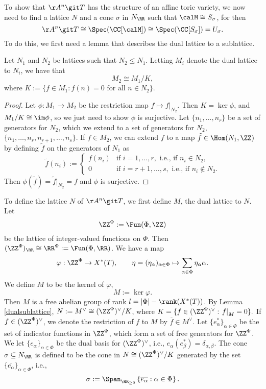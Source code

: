 To show that $\AA^n \git T$ has the structure of an affine toric variety, we now need to find a lattice $N$ and a cone $\sigma$ in $N_\RR$ such that $\calM \cong S_\sigma$, for then 
$$\AA^n \git T \cong \Spec(\CC[\calM]) \cong \Spec(\CC[S_\sigma]) = U_\sigma.$$
To do this, we first need a lemma that describes the dual lattice to a sublattice.

\begin{lemma}\label{dualsublattice}
Let $N_1$ and $N_2$ be lattices such that $N_2 \le N_1$.
Letting $M_i$ denote the dual lattice to $N_i$, we have that
$$M_2 \cong M_1 / K,$$
where $K := \{f \in M_1 : f(n) = 0 \text{ for all } n \in N_2\}.$
\end{lemma}
\begin{proof}
Let $\phi : M_1 \to M_2$ be the restriction map $f \mapsto \left. f \right|_{N_2}$.
Then $K = \ker \phi$, and $M_1 / K \cong \im \phi$, so we just need to show $\phi$ is surjective.
Let $\{n_1, \ldots, n_r\}$ be a set of generators for $N_2$, which we extend to a set of generators for $N_2$, $\{n_1, \ldots, n_r, n_{r+1}, \ldots, n_s\}$.
If $f \in M_2$, we can extend $f$ to a map $\tilde f \in \Hom(N_1, \ZZ)$ by defining $\tilde f$ on the generators of $N_1$ as
$$\tilde f(n_i) := \begin{cases} f(n_i) & \text{if } i = 1, \ldots, r, \text{ i.e., if } n_i \in N_2, \\ 0 & \text{if } i = r+1, \ldots, s, \text{ i.e., if } n_i \notin N_2. \end{cases}$$
Then $\phi(\tilde f) = \tilde f \big|_{N_2} = f$ and $\phi$ is surjective.
\end{proof}

To define the lattice $N$ of $\AA^n \git T$, we first define $M$, the dual lattice to $N$.
Let 
$$\ZZ^\Phi := \Fun(\Phi, \ZZ)$$ 
be the lattice of integer-valued functions on $\Phi$.
Then $(\ZZ^\Phi)_\RR \cong \RR^\Phi := \Fun(\Phi, \RR)$.
We have a map
$$\varphi : \ZZ^\Phi \to X^*(T), \qquad \eta = (\eta_\alpha)_{\alpha\in\Phi} \mapsto \sum_{\alpha \in \Phi} \eta_\alpha \alpha.$$
We define $M$ to be the kernel of $\varphi$,
$$M := \ker \varphi.$$
Then $M$ is a free abelian group of rank $l = |\Phi| - \rank(X^*(T))$.
By Lemma \ref{dualsublattice}, $N := M^\vee \cong (\ZZ^\Phi)^\vee / K$, where $K = \{f \in (\ZZ^\Phi)^\vee : \left. f \right|_{M} = 0\}.$
If $f \in (\ZZ^\Phi)^\vee$, we denote the restriction of $f$ to $M$ by $\overline{f} \in M^\vee$.
Let $\{e_\alpha^*\}_{\alpha\in\Phi}$ be the set of indicator functions in $\ZZ^\Phi$, which form a set of free generators for $\ZZ^\Phi$.
We let $\{e_\alpha\}_{\alpha\in\Phi}$ be the dual basis for $(\ZZ^\Phi)^\vee$, i.e., $e_\alpha(e^*_\beta) = \delta_{\alpha,\beta}$.
The cone $\sigma \subseteq N_\RR$ is defined to be the cone in $N \cong (\ZZ^\Phi)^\vee / K$ generated by the set $\{\overline{e_\alpha}\}_{\alpha\in\Phi}$, i.e.,
$$\sigma := \Span_{\RR_{\ge 0}} \left\{\overline{e_\alpha} : \alpha \in \Phi  \right\}.$$

